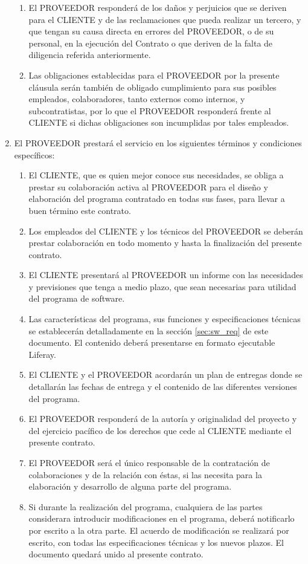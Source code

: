 \begin{description}[style=nextline]
\begin{enumerate}
\begin{enumerate}
    \item El PROVEEDOR responderá de los daños y perjuicios que se deriven para el CLIENTE y de las reclamaciones que pueda realizar un tercero, y que tengan su causa directa en errores del PROVEEDOR, o de su personal, en la ejecución del Contrato o que deriven de la falta de diligencia referida anteriormente.
    \item Las obligaciones establecidas para el PROVEEDOR por la presente cláusula serán también de obligado cumplimiento para sus posibles empleados, colaboradores, tanto externos como internos, y subcontratistas, por lo que el PROVEEDOR responderá frente al CLIENTE si dichas obligaciones son incumplidas por tales empleados.
  \end{enumerate}
  \item El PROVEEDOR prestará el servicio en los siguientes términos y condiciones específicos:
  \begin{enumerate}
    \item  El CLIENTE, que es quien mejor conoce sus necesidades, se obliga a prestar su colaboración activa al PROVEEDOR para el diseño y elaboración del programa contratado en todas sus fases, para llevar a buen término este contrato.
  	\item  Los empleados del CLIENTE y los técnicos del PROVEEDOR se deberán prestar colaboración en todo momento y hasta la finalización del presente contrato.
  	\item El CLIENTE presentará al PROVEEDOR un informe con las necesidades y previsiones que tenga a medio plazo, que sean necesarias para utilidad del programa de software.
  	\item Las características del programa, sus funciones y especificaciones técnicas se establecerán detalladamente en la sección \ref{sec:sw_req} de este documento. El contenido deberá presentarse en formato ejecutable Liferay.
  	\item El CLIENTE y el PROVEEDOR acordarán un plan de entregas donde se detallarán las fechas de entrega y el contenido de las diferentes versiones del programa.
  	\item El PROVEEDOR responderá de la autoría y originalidad del proyecto y del ejercicio pacífico de los derechos que cede al CLIENTE mediante el presente contrato.
  	\item El PROVEEDOR será el único responsable de la contratación de colaboraciones y de la relación con éstas, si las necesita para la elaboración y desarrollo de alguna parte del programa.
  	\item Si durante la realización del programa, cualquiera de las partes considerara introducir modificaciones en el programa, deberá notificarlo por escrito a la otra parte. El acuerdo de modificación se realizará por escrito, con todas las especificaciones técnicas y los nuevos plazos. El documento quedará unido al presente contrato.

\end{enumerate}
\end{enumerate}
\end{description}
